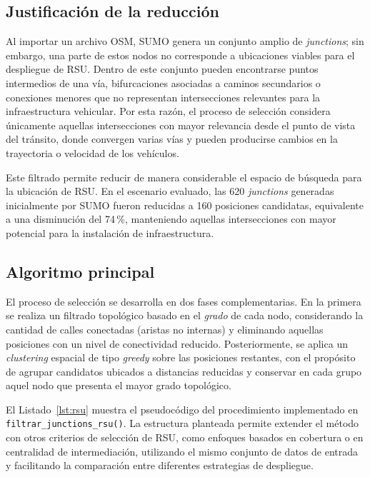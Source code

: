 \documentclass[smartcities,article,submit,oneauthor]{Definitions/mdpi}
\begin{document}
\subsection{Justificación de la reducción}
Al importar un archivo OSM, SUMO genera un conjunto amplio de
\emph{junctions}; sin embargo, una parte de estos nodos no corresponde a ubicaciones
viables para el despliegue de RSU. Dentro de este conjunto pueden encontrarse puntos
intermedios de una vía, bifurcaciones asociadas a caminos secundarios o conexiones
menores que no representan intersecciones relevantes para la infraestructura
vehicular. Por esta razón, el proceso de selección considera únicamente aquellas
intersecciones con mayor relevancia desde el punto de vista del tránsito, donde
convergen varias vías y pueden producirse cambios en la trayectoria o velocidad de
los vehículos.

Este filtrado permite reducir de manera considerable el espacio de búsqueda para la
ubicación de RSU. En el escenario evaluado, las 620 \emph{junctions} generadas
inicialmente por SUMO fueron reducidas a 160 posiciones candidatas, equivalente a
una disminución del 74\,\%, manteniendo aquellas intersecciones con mayor potencial
para la instalación de infraestructura.

\subsection{Algoritmo principal}
El proceso de selección se desarrolla en dos fases complementarias. En la primera se
realiza un filtrado topológico basado en el \emph{grado} de cada nodo, considerando
la cantidad de calles conectadas (aristas no internas) y eliminando aquellas
posiciones con un nivel de conectividad reducido. Posteriormente, se aplica un
\emph{clustering} espacial de tipo \emph{greedy} sobre las posiciones restantes,
con el propósito de agrupar candidatos ubicados a distancias reducidas y conservar
en cada grupo aquel nodo que presenta el mayor grado topológico.

El Listado~\ref{lst:rsu} muestra el pseudocódigo del procedimiento implementado en
\texttt{filtrar\_junctions\_rsu()}. La estructura planteada permite extender el
método con otros criterios de selección de RSU, como enfoques basados en cobertura o
en centralidad de intermediación, utilizando el mismo conjunto de datos de entrada
y facilitando la comparación entre diferentes estrategias de despliegue.
\end{document}
